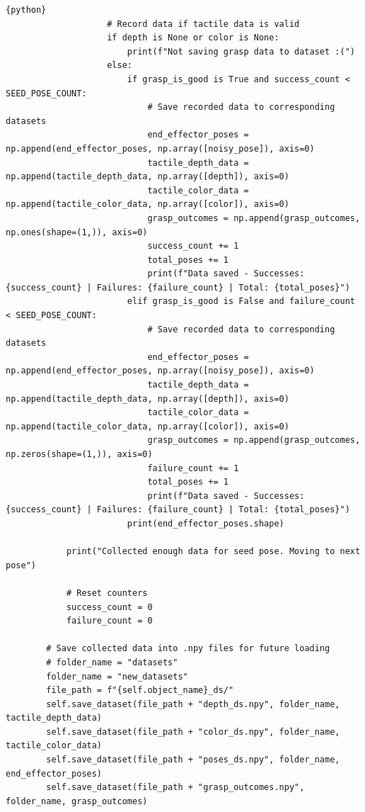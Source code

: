\documentclass[11pt, a4paper]{report}
\begin{document}
\begin{lstlisting}{python}
                    # Record data if tactile data is valid
                    if depth is None or color is None:
                        print(f"Not saving grasp data to dataset :(")
                    else:
                        if grasp_is_good is True and success_count < SEED_POSE_COUNT:
                            # Save recorded data to corresponding datasets
                            end_effector_poses = np.append(end_effector_poses, np.array([noisy_pose]), axis=0)
                            tactile_depth_data = np.append(tactile_depth_data, np.array([depth]), axis=0)
                            tactile_color_data = np.append(tactile_color_data, np.array([color]), axis=0)
                            grasp_outcomes = np.append(grasp_outcomes, np.ones(shape=(1,)), axis=0)
                            success_count += 1
                            total_poses += 1
                            print(f"Data saved - Successes: {success_count} | Failures: {failure_count} | Total: {total_poses}")
                        elif grasp_is_good is False and failure_count < SEED_POSE_COUNT:
                            # Save recorded data to corresponding datasets
                            end_effector_poses = np.append(end_effector_poses, np.array([noisy_pose]), axis=0)
                            tactile_depth_data = np.append(tactile_depth_data, np.array([depth]), axis=0)
                            tactile_color_data = np.append(tactile_color_data, np.array([color]), axis=0)
                            grasp_outcomes = np.append(grasp_outcomes, np.zeros(shape=(1,)), axis=0)
                            failure_count += 1
                            total_poses += 1
                            print(f"Data saved - Successes: {success_count} | Failures: {failure_count} | Total: {total_poses}")
                        print(end_effector_poses.shape)

            print("Collected enough data for seed pose. Moving to next pose")

            # Reset counters
            success_count = 0
            failure_count = 0

        # Save collected data into .npy files for future loading
        # folder_name = "datasets"
        folder_name = "new_datasets"
        file_path = f"{self.object_name}_ds/"
        self.save_dataset(file_path + "depth_ds.npy", folder_name, tactile_depth_data)
        self.save_dataset(file_path + "color_ds.npy", folder_name, tactile_color_data)
        self.save_dataset(file_path + "poses_ds.npy", folder_name, end_effector_poses)
        self.save_dataset(file_path + "grasp_outcomes.npy", folder_name, grasp_outcomes)
            


\end{lstlisting}
\end{document}
